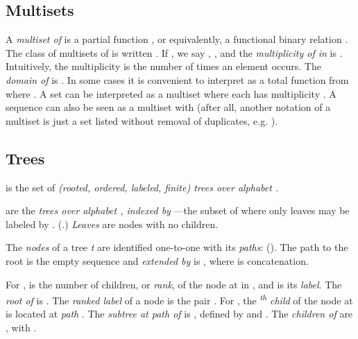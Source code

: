 \documentclass[english]{article}
\newcommand\comment[1]{}
\newcommand{\nth}[2]{#1\textsuperscript{\textit{#2}}}
\begin{document}
\subsection{Multisets}

A \emph{multiset  of } is a partial function , or
equivalently, a functional binary relation .  The
class of multisets of  is written .  If ,
we say , , and the \emph{multiplicity of  in } is
.  Intuitively, the multiplicity is the number of times an element occurs.
The \emph{domain of } is . In some cases it is
convenient to interpret  as a total function from 
where .  A set  can be interpreted as a
multiset where each  has multiplicity .  A sequence
 can also be seen as a multiset with
 (after all, another notation of a multiset is just a
set listed without removal of duplicates, e.g. ).

\comment{
The \emph{intersection}, or \emph{product}, of multisets  and  is .  Their \emph{union}, or \emph{sum} is  defined by
 where .  The \emph{size} of a multiset  is .  A multiset  can be \emph{scaled} by a constant : .

The \emph{factorial of a multiset } is the set of unique permutations
 that are equivalent to  when considered as a
multiset.  The number of unique permutations of a multiset  is given by

since all the  ways of reordering
the  identical items  are indistinguishable.  The multiset
factorial of a sequence can be generated in the tradition of sequence
permutations, except doing nothing when two items to be swapped are equal,
instead of explicitly counting the multiplicity of the unique elements.
}

\subsection{Trees}

 is the set of \emph{(rooted, ordered, labeled, finite) trees over
  alphabet .}

 are the \emph{trees over alphabet , indexed by }---the subset of  where only leaves may be labeled by .
(.)  \emph{Leaves} are nodes with no children.

The \emph{nodes} of a tree \emph{t} are identified one-to-one with its
\emph{paths}: \emph{} ().  The path
to the root is the empty sequence  and  \emph{extended by} 
is , where  is concatenation.

For ,  is the number of children, or \emph{rank},
of the node at  in , and  is its \emph{label}. The \emph{root of } is . The
\emph{ranked label} of a node is the pair
. For , the \nth{}{th} \emph{child} of the node at  is located at
\emph{path} .  The \emph{subtree at path  of } is ,
defined by  and
.  The
\emph{children of } are , with
.
\end{document}
